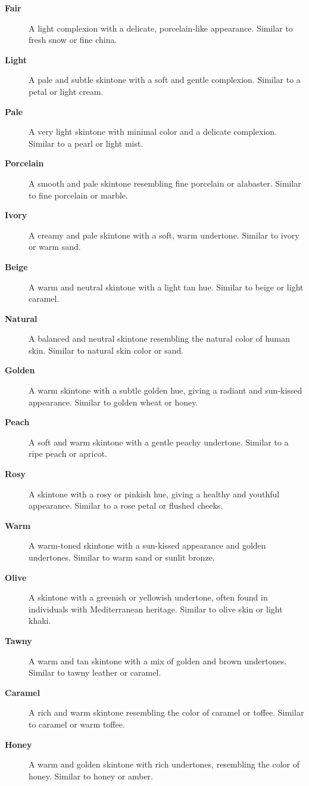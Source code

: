 \documentclass[12pt]{book}  %
\begin{document}
\begin{description}
    \item[\textbf{Fair}] A light complexion with a delicate, porcelain-like appearance. Similar to fresh snow or fine china.
    \item[\textbf{Light}] A pale and subtle skintone with a soft and gentle complexion. Similar to a petal or light cream.
    \item[\textbf{Pale}] A very light skintone with minimal color and a delicate complexion. Similar to a pearl or light mist.
    \item[\textbf{Porcelain}] A smooth and pale skintone resembling fine porcelain or alabaster. Similar to fine porcelain or marble.
    \item[\textbf{Ivory}] A creamy and pale skintone with a soft, warm undertone. Similar to ivory or warm sand.
    \item[\textbf{Beige}] A warm and neutral skintone with a light tan hue. Similar to beige or light caramel.
    \item[\textbf{Natural}] A balanced and neutral skintone resembling the natural color of human skin. Similar to natural skin color or sand.
    \item[\textbf{Golden}] A warm skintone with a subtle golden hue, giving a radiant and sun-kissed appearance. Similar to golden wheat or honey.
    \item[\textbf{Peach}] A soft and warm skintone with a gentle peachy undertone. Similar to a ripe peach or apricot.
    \item[\textbf{Rosy}] A skintone with a rosy or pinkish hue, giving a healthy and youthful appearance. Similar to a rose petal or flushed cheeks.
    \item[\textbf{Warm}] A warm-toned skintone with a sun-kissed appearance and golden undertones. Similar to warm sand or sunlit bronze.
    \item[\textbf{Olive}] A skintone with a greenish or yellowish undertone, often found in individuals with Mediterranean heritage. Similar to olive skin or light khaki.
    \item[\textbf{Tawny}] A warm and tan skintone with a mix of golden and brown undertones. Similar to tawny leather or caramel.
    \item[\textbf{Caramel}] A rich and warm skintone resembling the color of caramel or toffee. Similar to caramel or warm toffee.
    \item[\textbf{Honey}] A warm and golden skintone with rich undertones, resembling the color of honey. Similar to honey or amber.

\end{description}
\end{document}
